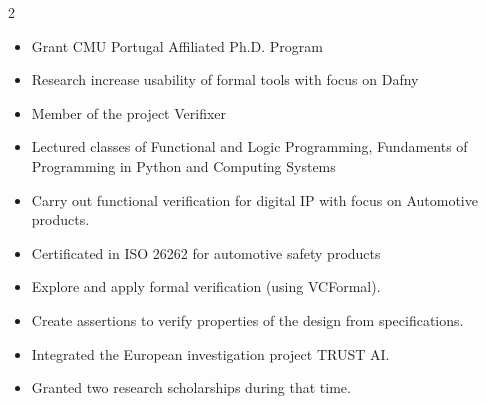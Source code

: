 \documentclass[10pt,a4paper,ragged2e,withhyper]{altacv}
\begin{document}
\begin{paracol}{2}

\begin{itemize}
\item Grant CMU Portugal Affiliated Ph.D. Program
\item Research increase usability of formal tools with focus on Dafny
\item Member of the project Verifixer
\end{itemize}
\divider

\begin{itemize}
\item Lectured classes of Functional and Logic Programming, Fundaments of Programming in Python and Computing Systems
\end{itemize}
\divider

\begin{itemize}
\item Carry out functional verification for digital IP with focus on Automotive products.
\item Certificated in ISO 26262 for automotive safety products
\item Explore and apply formal verification (using VCFormal).
\item Create assertions to verify properties of the design from specifications.
\end{itemize}
\divider

\begin{itemize}
\item Integrated the European investigation project TRUST AI.
\item Granted two research scholarships during that time.    
    
\end{itemize}
\divider




\end{paracol}
\end{document}

